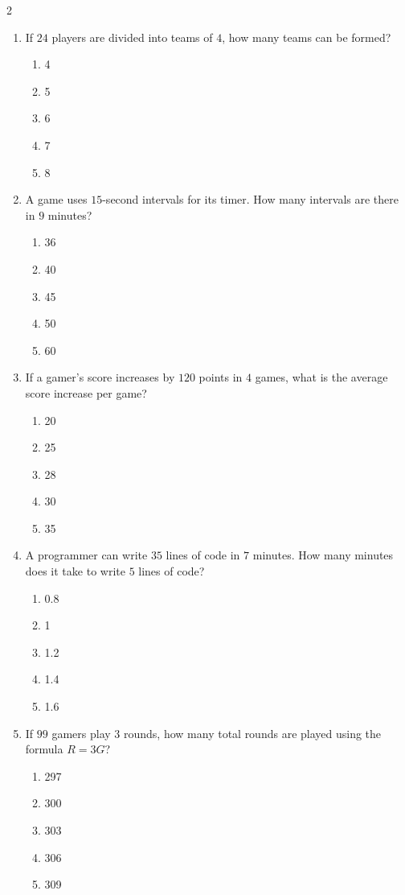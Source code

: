\documentclass[10pt]{article}
\begin{document}
\begin{multicols}{2}
\begin{enumerate}[label=\textbf{Q\arabic*.}, leftmargin=*, itemsep=6pt, parsep=0pt]
  \item \small If $24$ players are divided into teams of $4$, how many teams can be formed?
  \begin{enumerate}[label=(\Alph*), leftmargin=0.6cm, nosep, itemsep=2pt]
    \item 4
    \item 5
    \item 6
    \item 7
    \item 8
  \end{enumerate}

  \item \small A game uses $15$-second intervals for its timer. How many intervals are there in $9$ minutes?
  \begin{enumerate}[label=(\Alph*), leftmargin=0.6cm, nosep, itemsep=2pt]
    \item 36
    \item 40
    \item 45
    \item 50
    \item 60
  \end{enumerate}

  \item \small If a gamer's score increases by $120$ points in $4$ games, what is the average score increase per game?
  \begin{enumerate}[label=(\Alph*), leftmargin=0.6cm, nosep, itemsep=2pt]
    \item 20
    \item 25
    \item 28
    \item 30
    \item 35
  \end{enumerate}

  \item \small A programmer can write $35$ lines of code in $7$ minutes. How many minutes does it take to write $5$ lines of code?
  \begin{enumerate}[label=(\Alph*), leftmargin=0.6cm, nosep, itemsep=2pt]
    \item 0.8
    \item 1
    \item 1.2
    \item 1.4
    \item 1.6
  \end{enumerate}

  \item \small If $99$ gamers play $3$ rounds, how many total rounds are played using the formula $R = 3G$?
  \begin{enumerate}[label=(\Alph*), leftmargin=0.6cm, nosep, itemsep=2pt]
    \item 297
    \item 300
    \item 303
    \item 306
    \item 309
  \end{enumerate}


\end{enumerate}
\end{multicols}
\end{document}
